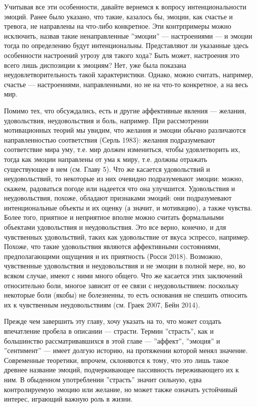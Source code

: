 \documentclass[11pt]{book}
\begin{document}
Учитывая все эти особенности, давайте вернемся к вопросу интенциональности эмоций. Ранее было указано, что такие, казалось бы, эмоции, как счастье и тревога, не направлены на что-либо конкретное. Эти контрпримеры можно исключить, назвав такие ненаправленные ''эмоции'' --- настроениями --- и эмоции тогда по определению будут интенциональны. Представляют ли указанные здесь особенности настроений угрозу для такого хода? Быть может, настроения это всего лишь диспозиции к эмоциям? Нет, уже была показана неудовлетворительность такой характеристики. Однако, можно считать, например, счастье --- настроениями, направленными, но не на что-то конкретное, а на весь мир.

Помимо тех, что обсуждались, есть и другие аффективные явления --- желания, удовольствия, неудовольствия и боль, например. При рассмотрении мотивационных теорий мы увидим, что желания и эмоции обычно различаются направленностью соответствия (Серль 1983): желания подразумевают соответствие мира уму, т.е. мир должен измениться, чтобы удовлетворить их, тогда как эмоции направлены от ума к миру, т.е. должны отражать существующее в нем (см. Главу 5). Что же касается удовольствий и неудовольствий, то некоторые из них очевидно подразумевают эмоции: можно, скажем, радоваться погоде или надеется что она улучшится. Удовольствия и неудовольствия, похоже, обладают признаками эмоций: они подразумевают интенциональные объекты и их оценку (а значит, и мотивацию), а также чувства. Более того, приятное и неприятное вполне можно считать формальными объектами удовольствия и неудовольствия. Это все верно, конечно, и для чувственных удовольствий, таких как удовольствие от вкуса эспрессо, например. Похоже, что такие удовольствия являются аффективными состояниями, предполагающими ощущения и их приятность (Росси 2018). Возможно, чувственные удовольствия и неудовольствия и не эмоции в полной мере, но, во всяком случае, имеют с ними много общего. Что же касается этих заключений относительно боли, многое зависит от ее связи с неудовольствием: поскольку некоторые боли (якобы) не болезненны, то есть основания не спешить относить их к чувственным неудовольствиям (см. Граек 2007, Бейн 2014).

Прежде чем завершить эту главу, хочу указать на то, что может создать впечатление пробела в описании --- страсти. Термин ''страсть'', как и большинство рассматривавшихся в этой главе --- ''аффект'', ''эмоция'' и ''сентимент'' --- имеет долгую историю, на протяжении которой менял значение. Современные теоретики, впрочем, склоняются к тому, что это лишь такое древнее название эмоций, подчеркивающее пассивность переживающего их к ним. В обыденном употреблении ''страсть'' значит сильную, едва контролируемую эмоцию или желание, но может также означать устойчивый интерес, играющий важную роль в жизни.
\end{document}
